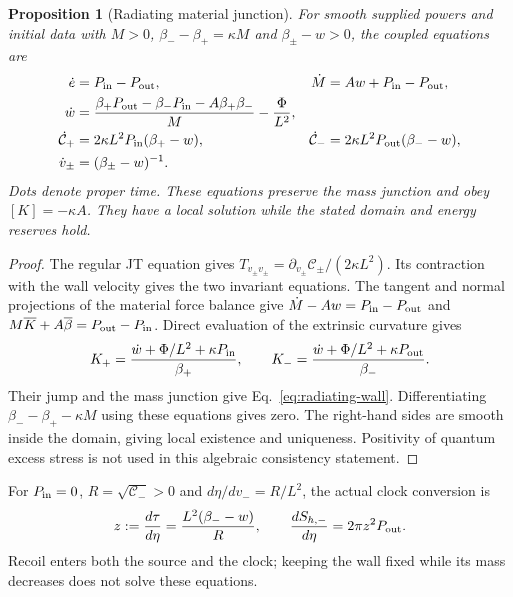 \documentclass[12pt,a4paper]{article}
\newtheorem{proposition}[theorem]{Proposition}
\begin{document}
\begin{proposition}[Radiating material junction]
\label{prop:radiating-junction}
For smooth supplied powers and initial data with $M>0$,
$\beta_--\beta_+=\kappa M$ and $\beta_\pm-w>0$, the coupled equations are
\begin{align}
 \dot e&=P_{\rm in}-P_{\rm out},&
 \dot M&=Aw+P_{\rm in}-P_{\rm out},\nonumber\\
 \dot w&=\frac{\beta_+P_{\rm out}-\beta_-P_{\rm in}
                         -A\beta_+\beta_-}{M}-\frac\Phi{L^2},
                     \label{eq:radiating-wall}\\
 \dot{\mathcal C}_+&=2\kappa L^2P_{\rm in}(\beta_+-w),&
 \dot{\mathcal C}_-&=2\kappa L^2P_{\rm out}(\beta_--w),\nonumber\\
 \dot v_\pm&=(\beta_\pm-w)^{-1}.&&\nonumber
\end{align}
Dots denote proper time. These equations preserve the mass junction and
obey $[K]=-\kappa A$. They have a local solution while the stated domain
and energy reserves hold.
\end{proposition}
\begin{proof}
The regular JT equation gives
$T_{v_\pm v_\pm}=\partial_{v_\pm}\mathcal C_\pm/(2\kappa L^2)$.
Its contraction with the wall velocity gives the two invariant equations.
The tangent and normal projections of the material force balance give
$\dot M-Aw=P_{\rm in}-P_{\rm out}$ and
$M\overline K+A\overline\beta=P_{\rm out}-P_{\rm in}$.
Direct evaluation of the extrinsic curvature gives
\[
 K_+=\frac{\dot w+\Phi/L^2+\kappa P_{\rm in}}{\beta_+},\qquad
 K_-=\frac{\dot w+\Phi/L^2+\kappa P_{\rm out}}{\beta_-}.
\]
Their jump and the mass junction give Eq.~\eqref{eq:radiating-wall}.
Differentiating $\beta_--\beta_+-\kappa M$ using these equations gives
zero. The right-hand sides are smooth inside the domain, giving local
existence and uniqueness. Positivity of quantum excess stress is not used
in this algebraic consistency statement.
\end{proof}

For $P_{\rm in}=0$, $R=\sqrt{\mathcal C_-}>0$ and
$d\eta/dv_-=R/L^2$, the actual clock conversion is
\begin{equation}\label{eq:material-clock-conversion}
 z:=\frac{d\tau}{d\eta}=\frac{L^2(\beta_--w)}R,\qquad
 \frac{dS_{h,-}}{d\eta}=2\pi z^2P_{\rm out}.
\end{equation}
Recoil enters both the source and the clock; keeping the wall fixed while
its mass decreases does not solve these equations.
\end{document}
